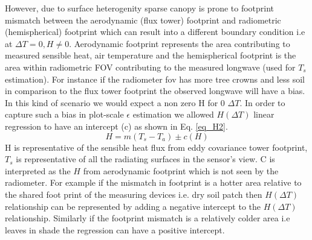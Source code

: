 \documentclass[fleqn,10pt]{wlscirep}
\begin{document}
However, due to surface heterogenity sparse canopy is prone to footprint mismatch between the aerodynamic (flux tower) footprint and radiometric (hemispherical) footprint \cite{chu2021representativeness,marcolla2018geometry,morillas2013using} which can result into a different boundary condition i.e at $\Delta T =0, H \not= 0$. Aerodynamic footprint represents the area contributing to measured sensible heat, air temperature and the hemispherical footprint is the area within radiometric FOV contributing to the measured longwave (used for $T_{s}$ estimation). For instance if the radiometer fov has more tree crowns and less soil in comparison to the flux tower footprint the observed longwave will have a bias. In this kind of scenario we would expect a non zero H for 0 $\Delta T$. In order to capture such a bias in plot-scale $\epsilon$ estimation we allowed $H(\Delta T)$ linear regression to have an intercept (c) as shown in Eq. \ref{eq_H2}.
\begin{equation}\label{eq_H2}
H= m(T_{s} - T_{a}) \pm  c(H)
\end{equation}
H is representative of the sensible heat flux from eddy covariance tower footprint,$T_{s}$ is representative of all the radiating surfaces in the sensor’s view. C is interpreted as the $H$ from aerodynamic footprint which is not seen by the radiometer. For example if the mismatch in footprint is a hotter area relative to the shared foot print of the measuring devices  i.e. dry soil patch then $H(\Delta T)$ relationship can be represented by adding a negative intercept to the $H (\Delta T)$ relationship. Similarly if the footprint mismatch is a relatively colder area i.e leaves in shade the regression can have a positive intercept.

\end{document}
